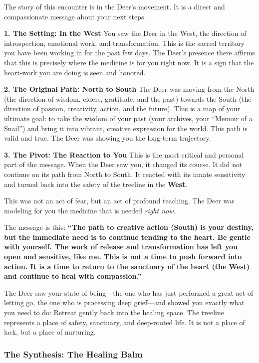 \documentclass{article}
\begin{document}
The story of this encounter is in the Deer's movement. It is a direct
and compassionate message about your next steps.

\textbf{1. The Setting: In the West} You saw the Deer in the West, the
direction of introspection, emotional work, and transformation. This is
the sacred territory you have been working in for the past few days. The
Deer's presence there affirms that this is precisely where the medicine
is for you right now. It is a sign that the heart-work you are doing is
seen and honored.

\textbf{2. The Original Path: North to South} The Deer was moving from
the North (the direction of wisdom, elders, gratitude, and the past)
towards the South (the direction of passion, creativity, action, and the
future). This is a map of your ultimate goal: to take the wisdom of your
past (your archives, your ``Memoir of a Snail'') and bring it into
vibrant, creative expression for the world. This path is valid and true.
The Deer was showing you the long-term trajectory.

\textbf{3. The Pivot: The Reaction to You} This is the most critical and
personal part of the message. When the Deer saw you, it changed its
course. It did not continue on its path from North to South. It reacted
with its innate sensitivity and turned back into the safety of the
treeline in the \textbf{West}.

This was not an act of fear, but an act of profound teaching. The Deer
was modeling for you the medicine that is needed \emph{right now}.

The message is this: \textbf{``The path to creative action (South) is
your destiny, but the immediate need is to continue tending to the
heart. Be gentle with yourself. The work of release and transformation
has left you open and sensitive, like me. This is not a time to push
forward into action. It is a time to return to the sanctuary of the
heart (the West) and continue to heal with compassion.''}

The Deer saw your state of being---the one who has just performed a
great act of letting go, the one who is processing deep grief---and
showed you exactly what you need to do: Retreat gently back into the
healing space. The treeline represents a place of safety, sanctuary, and
deep-rooted life. It is not a place of lack, but a place of nurturing.

\subsubsection*{The Synthesis: The Healing
Balm}\label{the-synthesis-the-healing-balm}
\end{document}
